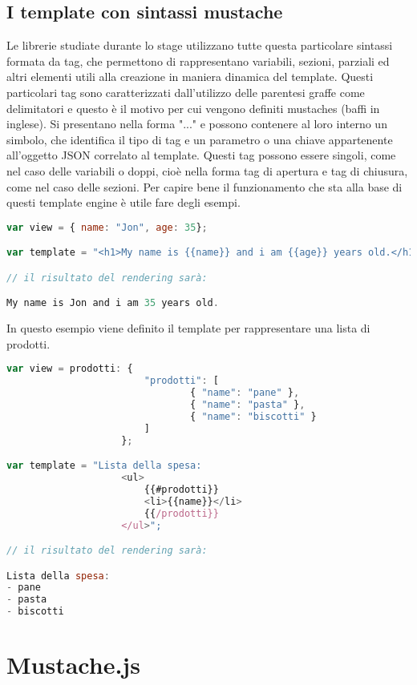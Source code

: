 \subsection{I template con sintassi mustache}
Le librerie studiate durante lo stage utilizzano tutte questa particolare sintassi formata da tag, che permettono di rappresentano variabili, sezioni, parziali ed altri elementi utili alla creazione in maniera dinamica del template.
Questi particolari tag sono caratterizzati dall'utilizzo delle parentesi graffe come delimitatori e questo è il motivo per cui vengono definiti mustaches (baffi in inglese).
Si presentano nella forma "{{...}}" e possono contenere al loro interno un simbolo, che identifica il tipo di tag e un parametro o una chiave appartenente all'oggetto JSON correlato al template.
Questi tag possono essere singoli, come nel caso delle variabili o doppi, cioè nella forma tag di apertura e tag di chiusura, come nel caso delle sezioni.
Per capire bene il funzionamento che sta alla base di questi template engine è utile fare degli esempi.
\begin{lstlisting}[language=JavaScript, caption=Esempio di template rappresentante una variabile.]
var view = { name: "Jon", age: 35};

var template = "<h1>My name is {{name}} and i am {{age}} years old.</h1>";

// il risultato del rendering sarà:

My name is Jon and i am 35 years old.
\end{lstlisting}
In questo esempio viene definito il template per rappresentare una lista di prodotti.
\begin{lstlisting}[language=JavaScript, caption=Esempio di template rappresentante una sezione.]
var view = prodotti: { 
						"prodotti": [
    							{ "name": "pane" },
    							{ "name": "pasta" },
    							{ "name": "biscotti" }
  						]
					};

var template = "Lista della spesa:
					<ul>
						{{#prodotti}}
						<li>{{name}}</li>
						{{/prodotti}}
					</ul>";

// il risultato del rendering sarà:

Lista della spesa:
- pane
- pasta
- biscotti
\end{lstlisting}

\section{Mustache.js}

